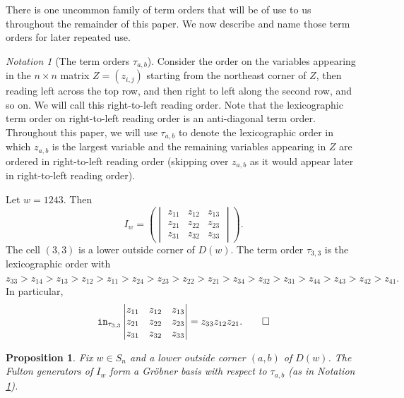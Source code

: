 \documentclass[12pt,reqno]{amsart}
\newtheorem{proposition}[theorem]{Proposition}
\newtheorem{Main Conjecture}[theorem]{Main Conjecture}
\theoremstyle{remark}
\newenvironment{example}
  {\pushQED{\qed}\renewcommand{\qedsymbol}{$\diamondsuit$}\examplex}
  {\popQED\endexamplex}
\newtheorem{notation}[theorem]{Notation}
\theoremstyle{plain}
\newcommand{\mydef}[1]{{\bf #1}}
\newcommand{\init}{{\tt in}}
\begin{document}
There is one uncommon family of term orders that will be of use to us throughout the remainder of this paper.  We now describe and name those term orders for later repeated use.
\begin{notation}[The term orders $\tau_{a,b}$]\label{not:tau}
 Consider the order on the variables appearing in the $n \times n$ matrix $Z = (z_{i,j})$ starting from the northeast corner of $Z$, then reading left across the top row, and then right to left along the second row, and so on.  We will call this right-to-left reading order.  Note that the lexicographic term order on right-to-left reading order is an anti-diagonal term order. 
 Throughout this paper, we will use  \mydef{$\tau_{a,b}$} to denote the lexicographic order in which $z_{a,b}$ is the largest variable and the remaining variables appearing in $Z$ are ordered in right-to-left reading order (skipping over $z_{a,b}$ as it would appear later in right-to-left reading order). 
\end{notation} 


\begin{example}
Let $w=1243$.  Then 
\[I_w=\left(\begin{vmatrix} z_{11} & z_{12} & z_{13} \\
z_{21} & z_{22} & z_{23} \\
z_{31} & z_{32} & z_{33} 
 \end{vmatrix}\right).\]
 The cell $(3,3)$ is a lower outside corner of $D(w)$.  The term order $\tau_{3,3}$ is the lexicographic order with $z_{33}>z_{14}>z_{13}>z_{12}>z_{11}>z_{24}>z_{23}>z_{22}>z_{21}>z_{34}>z_{32}>z_{31}>z_{44}>z_{43}>z_{42}>z_{41}.$   In particular, \[\init_{\tau_{3,3}}\begin{vmatrix} z_{11} & z_{12} & z_{13} \\
z_{21} & z_{22} & z_{23} \\
z_{31} & z_{32} & z_{33} 
 \end{vmatrix}=z_{33}z_{12}z_{21}. \qedhere\] 
\end{example}


\begin{proposition}\label{prop:naturalGensGrobner}
Fix $w \in S_n$ and a lower outside corner $(a,b)$ of $D(w)$.  The Fulton generators of $I_w$ 
 form a Gr\"obner basis
with respect to $\tau_{a,b}$ (as in Notation \ref{not:tau}).
\end{proposition}
\end{document}

